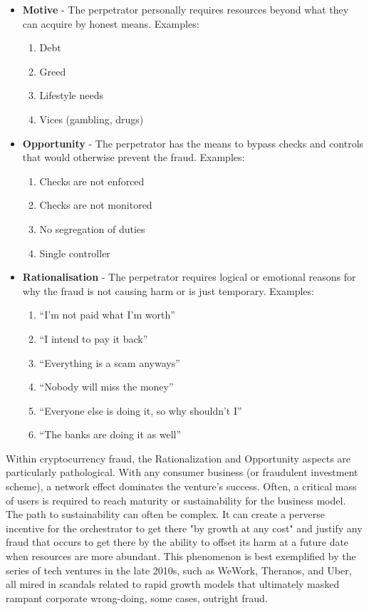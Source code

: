 \begin{itemize}
\tightlist
\item
  \textbf{Motive} - The perpetrator personally requires resources beyond what
  they can acquire by honest means. Examples:

  \begin{enumerate}
  \def\labelenumi{\arabic{enumi}.}
  \tightlist
  \item
    Debt
  \item
    Greed
  \item
    Lifestyle needs
  \item
    Vices (gambling, drugs)
  \end{enumerate}
\item
  \textbf{Opportunity} - The perpetrator has the means to bypass checks and
  controls that would otherwise prevent the fraud. Examples:

  \begin{enumerate}
  \def\labelenumi{\arabic{enumi}.}
  \tightlist
  \item
    Checks are not enforced
  \item
    Checks are not monitored
  \item
    No segregation of duties
  \item
    Single controller
  \end{enumerate}
\item
  \textbf{Rationalisation} - The perpetrator requires logical or emotional
  reasons for why the fraud is not causing harm or is just temporary.
  Examples:

  \begin{enumerate}
  \def\labelenumi{\arabic{enumi}.}
  \tightlist
  \item
    ``I'm not paid what I'm worth''
  \item
    ``I intend to pay it back''
  \item
    ``Everything is a scam anyways''
  \item
    ``Nobody will miss the money''
  \item
    ``Everyone else is doing it, so why shouldn't I''
  \item
    ``The banks are doing it as well''
  \end{enumerate}
\end{itemize}

Within cryptocurrency fraud, the Rationalization and Opportunity aspects are
particularly pathological. With any consumer business (or fraudulent investment
scheme), a network effect dominates the venture's success. Often, a critical
mass of users is required to reach maturity or sustainability for the business
model. The path to sustainability can often be complex. It can create a perverse
incentive for the orchestrator to get there "by growth at any cost" and justify
any fraud that occurs to get there by the ability to offset its harm at a future
date when resources are more abundant. This phenomenon is best exemplified by
the series of tech ventures in the late 2010s, such as WeWork, Theranos, and
Uber, all mired in scandals related to rapid growth models that ultimately
masked rampant corporate wrong-doing, some cases, outright fraud.

